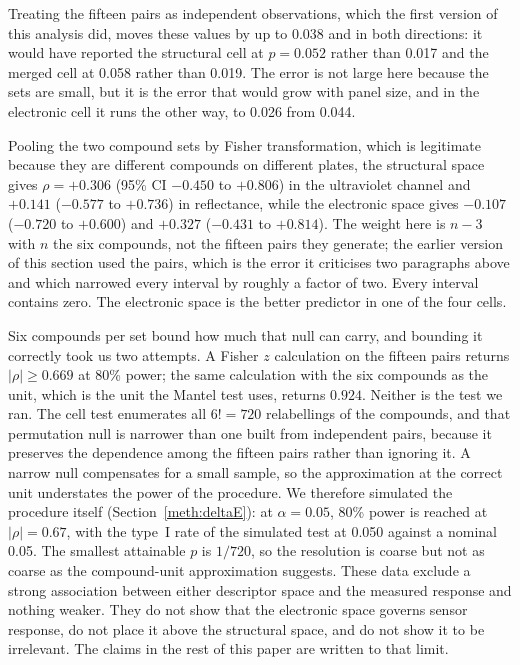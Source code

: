\documentclass[11pt,a4paper]{article}
\begin{document}
Treating the fifteen pairs as independent observations, which the first version
of this analysis did, moves these values by up to 0.038 and in both directions:
it would have reported the structural cell at $p = 0.052$ rather than 0.017 and
the merged cell at 0.058 rather than 0.019. The error is not large here
because the sets are small, but it is the error that would grow with panel size,
and in the electronic cell it runs the other way, to 0.026 from 0.044.

Pooling the two compound sets by Fisher transformation, which is legitimate
because they are different compounds on different plates, the structural space
gives $\rho = +0.306$ (95\% CI $-0.450$ to $+0.806$) in the ultraviolet channel
and $+0.141$ ($-0.577$ to $+0.736$) in reflectance, while the electronic space
gives $-0.107$ ($-0.720$ to $+0.600$) and $+0.327$ ($-0.431$ to $+0.814$). The
weight here is $n-3$ with $n$ the six compounds, not the fifteen pairs they
generate; the earlier version of this section used the pairs, which is the error
it criticises two paragraphs above and which narrowed every interval by roughly
a factor of two. Every interval contains zero. The electronic space is the
better predictor in one of the four cells.

Six compounds per set bound how much that null can carry, and bounding it
correctly took us two attempts. A Fisher $z$ calculation on the fifteen pairs
returns $|\rho| \ge 0.669$ at 80\% power; the same calculation with the six
compounds as the unit, which is the unit the Mantel test uses, returns $0.924$.
Neither is the test we ran. The cell test enumerates all $6! = 720$ relabellings
of the compounds, and that permutation null is narrower than one built from
independent pairs, because it preserves the dependence among the fifteen pairs
rather than ignoring it. A narrow null compensates for a small sample, so the
approximation at the correct unit understates the power of the procedure. We
therefore simulated the procedure itself (Section~\ref{meth:deltaE}): at
$\alpha = 0.05$, 80\% power is reached at $|\rho| = 0.67$, with the type~I rate
of the simulated test at 0.050 against a nominal 0.05. The smallest attainable
$p$ is $1/720$, so the resolution is coarse but not as coarse as the
compound-unit approximation suggests. These data exclude a strong association
between either descriptor space and the measured response and nothing weaker. They do not show that the
electronic space governs sensor response, do not place it above the structural
space, and do not show it to be irrelevant. The claims in the rest of this paper
are written to that limit.
\end{document}
